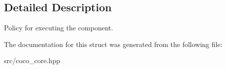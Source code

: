 \subsection{Detailed Description}
Policy for executing the component. 

The documentation for this struct was generated from the following file\+:\begin{DoxyCompactItemize}
\item 
src/coco\+\_\+core.\+hpp\end{DoxyCompactItemize}

